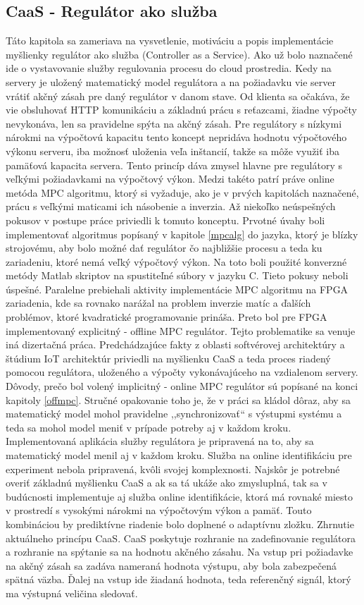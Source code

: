 \subsection{CaaS - Regulátor ako služba} \label{caas}
Táto kapitola sa zameriava na vysvetlenie, motiváciu a popis implementácie myšlienky regulátor ako služba (Controller as a Service). Ako už bolo naznačené ide o vystavovanie služby regulovania procesu do cloud prostredia. Kedy na servery je uložený matematický model regulátora a na požiadavku vie server vrátiť akčný zásah pre daný regulátor v danom stave. Od klienta sa očakáva, že vie obsluhovať HTTP komunikáciu a základnú prácu s reťazcami, žiadne výpočty nevykonáva, len sa pravidelne spýta na akčný zásah. Pre regulátory s nízkymi nárokmi na výpočtovú kapacitu tento koncept nepridáva hodnotu výpočtového výkonu serveru, iba možnosť uloženia veľa inštancií, takže sa môže využiť iba pamäťová kapacita servera. Tento princíp dáva zmysel hlavne pre regulátory s veľkými požiadavkami na výpočtový výkon. Medzi takéto patrí práve online metóda MPC algoritmu, ktorý si vyžaduje, ako je v prvých kapitolách naznačené, prácu s veľkými maticami ich násobenie a  inverzia. Až niekoľko neúspešných pokusov v postupe práce priviedli k tomuto konceptu. Prvotné úvahy boli implementovať algoritmus popísaný v kapitole \ref{mpcalg} do jazyka, ktorý je blízky strojovému, aby bolo možné dať regulátor čo najbližšie procesu a teda ku zariadeniu, ktoré nemá veľký výpočtový výkon. Na toto boli použité konverzné metódy Matlab skriptov na spustiteľné súbory v jazyku C. Tieto pokusy neboli úspešné. Paralelne prebiehali aktivity implementácie MPC algoritmu na FPGA zariadenia, kde sa rovnako narážal na problem inverzie matíc a ďalších problémov, ktoré kvadratické programovanie prináša. Preto bol pre FPGA implementovaný explicitný - offline MPC regulátor. Tejto problematike sa venuje iná dizertačná práca. Predchádzajúce fakty z oblasti softvérovej architektúry a štúdium IoT architektúr priviedli na myšlienku CaaS a teda proces riadený pomocou regulátora, uloženého a výpočty vykonávajúceho na vzdialenom servery. Dôvody, prečo bol volený implicitný - online MPC regulátor sú popísané na konci kapitoly \ref{offmpc}. Stručné opakovanie toho je, že v práci sa kládol dôraz, aby sa matematický model mohol pravidelne ,,synchronizovať`` s výstupmi systému a teda sa mohol model meniť v prípade potreby aj v každom kroku. Implementovaná aplikácia služby regulátora je pripravená na to, aby sa matematický model menil aj v každom kroku. Služba na online identifikáciu pre experiment nebola pripravená, kvôli svojej komplexnosti. Najskôr je potrebné overiť základnú myšlienku CaaS a ak sa tá ukáže ako zmysluplná, tak sa v budúcnosti implementuje aj služba online identifikácie, ktorá má rovnaké miesto v prostredí s vysokými nárokmi na výpočtovým výkon a pamäť. Touto kombináciou by prediktívne riadenie bolo doplnené o adaptívnu zložku. Zhrnutie aktuálneho princípu CaaS. CaaS poskytuje rozhranie na zadefinovanie regulátora a rozhranie na spýtanie sa na hodnotu akčného zásahu. Na vstup pri požiadavke na akčný zásah sa zadáva nameraná hodnota výstupu, aby bola zabezpečená spätná väzba. Ďalej na vstup ide žiadaná hodnota, teda referenčný signál, ktorý ma výstupná veličina sledovať.  

